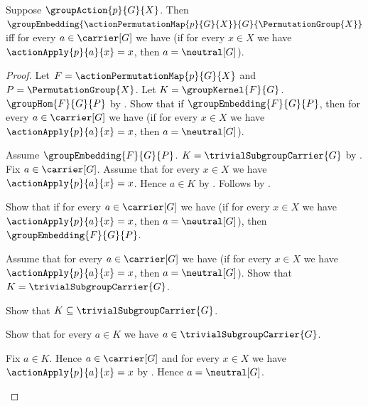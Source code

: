 \begin{theorem}\label{action_permutation_map_faithful_iff}
    Suppose $\groupAction{p}{G}{X}$.
    Then
        $\groupEmbedding
            {\actionPermutationMap{p}{G}{X}}
            {G}{\PermutationGroup{X}}$ iff
        for every $a\in\carrier[G]$ we have
            (if for every $x\in X$ we have
                $\actionApply{p}{a}{x}=x$, then
                $a=\neutral[G]$).
\end{theorem}
\begin{proof}
    Let $F=\actionPermutationMap{p}{G}{X}$ and
        $P=\PermutationGroup{X}$.
    Let $K=\groupKernel{F}{G}$.
    $\groupHom{F}{G}{P}$ by
        .
    Show that if $\groupEmbedding{F}{G}{P}$, then
        for every $a\in\carrier[G]$ we have
            (if for every $x\in X$ we have
                $\actionApply{p}{a}{x}=x$, then
                $a=\neutral[G]$).
    \begin{subproof}
        Assume $\groupEmbedding{F}{G}{P}$.
        $K=\trivialSubgroupCarrier{G}$ by
            .
        Fix $a\in\carrier[G]$.
        Assume that for every $x\in X$ we have
            $\actionApply{p}{a}{x}=x$.
        Hence $a\in K$ by
            .
        Follows by
            .
    \end{subproof}
    Show that if for every $a\in\carrier[G]$ we have
        (if for every $x\in X$ we have
            $\actionApply{p}{a}{x}=x$, then
            $a=\neutral[G]$), then
        $\groupEmbedding{F}{G}{P}$.
    \begin{subproof}
        Assume that for every $a\in\carrier[G]$ we have
            (if for every $x\in X$ we have
                $\actionApply{p}{a}{x}=x$, then
                $a=\neutral[G]$).
        Show that $K=\trivialSubgroupCarrier{G}$.
        \begin{subproof}
            Show that $K\subseteq\trivialSubgroupCarrier{G}$.
            \begin{subproof}
                Show that for every $a\in K$ we have
                    $a\in\trivialSubgroupCarrier{G}$.
                \begin{subproof}
                    Fix $a\in K$.
                    Hence $a\in\carrier[G]$ and for every $x\in X$
                        we have $\actionApply{p}{a}{x}=x$ by
                        .
                    Hence $a=\neutral[G]$.

\end{subproof}
\end{subproof}
\end{subproof}
\end{subproof}
\end{proof}
